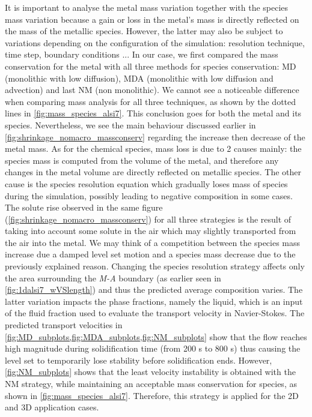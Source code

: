 It is important to analyse the metal mass variation together with the species mass variation
because a gain or loss in the metal's mass is directly reflected on the mass of the metallic species.
However, the latter may also be subject to variations depending on the configuration of the simulation:
resolution technique, time step, boundary conditions ...
In our case, we first compared the mass conservation for the metal with all three methods for species conservation:
MD (monolithic with low diffusion), MDA (monolithic with low diffusion and advection) and last NM (non monolithic).
We cannot see a noticeable difference when comparing mass analysis for all three techniques, 
as shown by the dotted lines in \cref{fig:mass_species_alsi7}.
This conclusion goes for both the metal and its species. 
Nevertheless, we see the main behaviour discussed earlier in \cref{fig:shrinkage_nomacro_massconserv} regarding the increase then decrease of the 
metal mass. As for the chemical species, mass loss is due to 2 causes mainly: the species mass is computed from the volume of the metal,
and therefore any changes in the metal volume are directly reflected on metallic species. The other cause is the species resolution
equation which gradually loses mass of species during the simulation, possibly leading to negative composition
in some cases. The solute rise observed in the same figure (\cref{fig:shrinkage_nomacro_massconserv}) for all three strategies
is the result of taking into account some solute in the air which may slightly transported from the air into the metal.
We may think of a competition between the species mass increase due a damped level set motion and a species mass decrease
due to the previously explained reason.
Changing the species resolution strategy affects only the area surrounding the \emph{M-A} boundary (as earlier seen in 
\cref{fig:1dalsi7_wVSlength}) and thus the predicted average composition varies. The latter variation impacts the phase fractions,
namely the liquid, which is an input of the fluid fraction used to evaluate the transport velocity in Navier-Stokes.
The predicted transport velocities in \cref{fig:MD_subplots,fig:MDA_subplots,fig:NM_subplots} show that the flow reaches high
magnitude during solidification time (from 200 s to 800 s) thus causing the level set to temporarily lose stability before
solidification ends. However, \cref{fig:NM_subplots} shows that the least velocity instability 
is obtained with the NM strategy, while maintaining an acceptable mass conservation for species, as shown in \cref{fig:mass_species_alsi7}.
Therefore, this strategy is applied for the 2D and 3D application cases.

